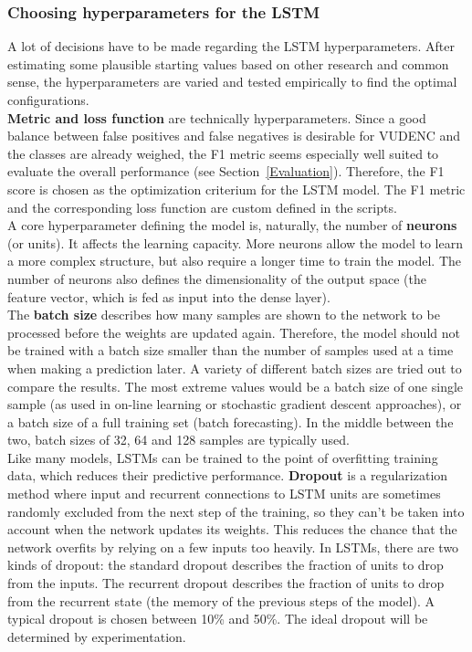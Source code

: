 \documentclass[
a4paper,
pagesize,
pdftex,
12pt,
ngerman,
fleqn,
final,
]{scrartcl}
\begin{document}
	\subsubsection{Choosing hyperparameters for the LSTM}
	A lot of decisions have to be made regarding the LSTM hyperparameters. After estimating some plausible starting values based on other research and common sense, the hyperparameters are varied and tested empirically to find the optimal configurations.\\
	\textbf{Metric and loss function} are technically hyperparameters. Since a good balance between false positives and false negatives is desirable for VUDENC and the classes are already weighed, the F1 metric seems especially well suited to evaluate the overall performance (see Section~\ref{Evaluation}). Therefore, the F1 score is chosen as the optimization criterium for the LSTM model. The F1 metric and the corresponding loss function are custom defined in the scripts.\\
	A core hyperparameter defining the model is, naturally, the number of \textbf{neurons} (or units). It affects the learning capacity. More neurons allow the model to learn a more complex structure, but also require a longer time to train the model. The number of neurons also defines the dimensionality of the output space (the feature vector, which is fed as input into the dense layer).\\  
	The \textbf{batch size} describes how many samples are shown to the network to be processed before the weights are updated again. Therefore, the model should not be trained with a batch size smaller than the number of samples used at a time when making a prediction later. A variety of different batch sizes are tried out to compare the results. The most extreme values would be a batch size of one single sample (as used in on-line learning or stochastic gradient descent approaches), or a batch size of a full training set (batch forecasting). In the middle between the two, batch sizes of 32, 64 and 128 samples are typically used.\\
	Like many models, LSTMs can be trained to the point of overfitting training data, which reduces their predictive performance. \textbf{Dropout} is a regularization method where input and recurrent connections to LSTM units are sometimes randomly excluded from the next step of the training, so they can't be taken into account when the network updates its weights. This reduces the chance that the network overfits by relying on a few inputs too heavily. In LSTMs, there are two kinds of dropout: the standard dropout describes the fraction of units to drop from the inputs. The recurrent dropout describes the fraction of units to drop from the recurrent state (the memory of the previous steps of the model). A typical dropout is chosen between 10\% and 50\%. The ideal dropout will be determined by experimentation.\\
\end{document}
